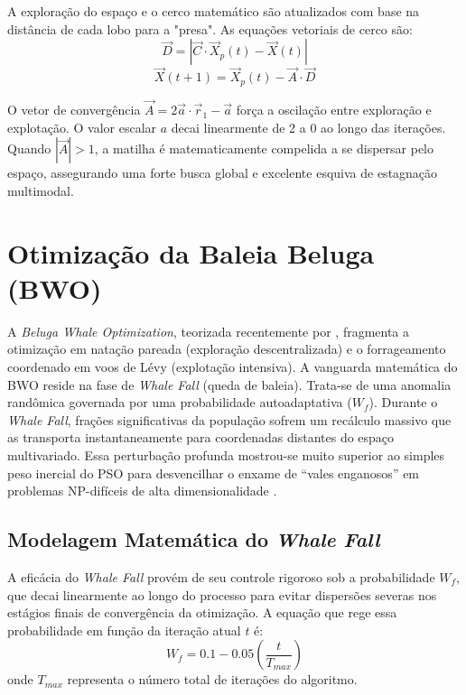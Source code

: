 \documentclass[12pt, a4paper, oneside]{report}
\begin{document}
A exploração do espaço e o cerco matemático são atualizados com base na distância de cada lobo para a "presa". As equações vetoriais de cerco são:
\begin{equation}
    \vec{D} = |\vec{C} \cdot \vec{X}_p(t) - \vec{X}(t)|
\end{equation}
\begin{equation}
    \vec{X}(t+1) = \vec{X}_p(t) - \vec{A} \cdot \vec{D}
\end{equation}

O vetor de convergência $\vec{A} = 2\vec{a} \cdot \vec{r}_1 - \vec{a}$ força a oscilação entre exploração e explotação. O valor escalar $a$ decai linearmente de 2 a 0 ao longo das iterações. Quando $|\vec{A}| > 1$, a matilha é matematicamente compelida a se dispersar pelo espaço, assegurando uma forte busca global e excelente esquiva de estagnação multimodal.

\section{Otimização da Baleia Beluga (BWO)}

A \textit{Beluga Whale Optimization}, teorizada recentemente por \citet{zhong2022beluga}, fragmenta a otimização em natação pareada (exploração descentralizada) e o forrageamento coordenado em voos de Lévy (explotação intensiva). A vanguarda matemática do BWO reside na fase de \textit{Whale Fall} (queda de baleia). Trata-se de uma anomalia randômica governada por uma probabilidade autoadaptativa ($W_f$). Durante o \textit{Whale Fall}, frações significativas da população sofrem um recálculo massivo que as transporta instantaneamente para coordenadas distantes do espaço multivariado. Essa perturbação profunda mostrou-se muito superior ao simples peso inercial do PSO para desvencilhar o enxame de ``vales enganosos'' em problemas NP-difíceis de alta dimensionalidade \citep{zhong2022beluga}.

\subsection{Modelagem Matemática do \textit{Whale Fall}}

A eficácia do \textit{Whale Fall} provém de seu controle rigoroso sob a probabilidade $W_f$, que decai linearmente ao longo do processo para evitar dispersões severas nos estágios finais de convergência da otimização. A equação que rege essa probabilidade em função da iteração atual $t$ é:
\begin{equation}
    W_f = 0.1 - 0.05 \left( \frac{t}{T_{max}} \right)
\end{equation}
onde $T_{max}$ representa o número total de iterações do algoritmo. 
\end{document}
